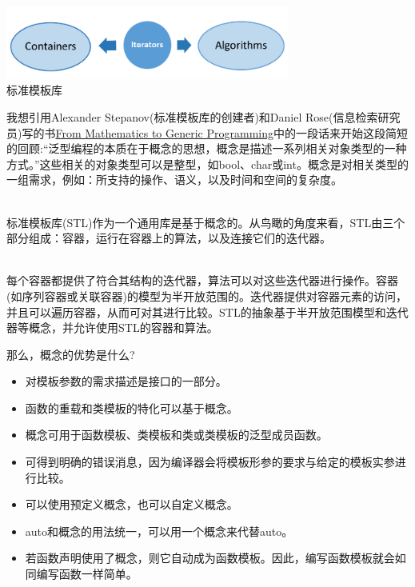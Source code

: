 \begin{center}
\includegraphics[width=0.7\textwidth]{content/3/chapter4/images/6.png}\\
标准模板库
\end{center}

\begin{tcolorbox}[breakable,enhanced jigsaw,colback=blue!5!white,colframe=blue!75!black,title={泛型编程的本质}]
我想引用Alexander Stepanov(标准模板库的创建者)和Daniel Rose(信息检索研究员)写的书\href{https://www.fm2gp.com/}{From Mathematics to Generic Programming}中的一段话来开始这段简短的回顾:“泛型编程的本质在于概念的思想，概念是描述一系列相关对象类型的一种方式。”这些相关的对象类型可以是整型，如bool、char或int。概念是对相关类型的一组需求，例如：所支持的操作、语义，以及时间和空间的复杂度。

\hspace*{\fill} \\ %
标准模板库(STL)作为一个通用库是基于概念的。从鸟瞰的角度来看，STL由三个部分组成：容器，运行在容器上的算法，以及连接它们的迭代器。

\hspace*{\fill} \\ %
每个容器都提供了符合其结构的迭代器，算法可以对这些迭代器进行操作。容器(如序列容器或关联容器)的模型为半开放范围的。迭代器提供对容器元素的访问，并且可以遍历容器，从而可对其进行比较。STL的抽象基于半开放范围模型和迭代器等概念，并允许使用STL的容器和算法。
\end{tcolorbox}

那么，概念的优势是什么?


\begin{itemize}
\item 
对模板参数的需求描述是接口的一部分。

\item 
函数的重载和类模板的特化可以基于概念。

\item 
概念可用于函数模板、类模板和类或类模板的泛型成员函数。

\item 
可得到明确的错误消息，因为编译器会将模板形参的要求与给定的模板实参进行比较。

\item 
可以使用预定义概念，也可以自定义概念。

\item 
auto和概念的用法统一，可以用一个概念来代替auto。

\item 
若函数声明使用了概念，则它自动成为函数模板。因此，编写函数模板就会如同编写函数一样简单。
\end{itemize}


